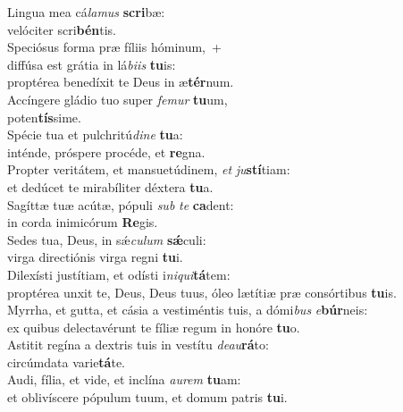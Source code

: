 \evenverse Lingua mea cá\textit{la}\textit{mus} \textbf{scri}bæ:~\*\\
\evenverse velóciter scri\textbf{bén}tis.\\
\oddverse Speciósus forma præ fíliis hóminum,~+\\
\oddverse  diffúsa est grátia in lá\textit{bi}\textit{is} \textbf{tu}is:~\*\\
\oddverse proptérea benedíxit te Deus in æ\textbf{tér}num.\\
\evenverse Accíngere gládio tuo super \textit{fe}\textit{mur} \textbf{tu}um,~\*\\
\evenverse poten\textbf{tís}sime.\\
\oddverse Spécie tua et pulchritú\textit{di}\textit{ne} \textbf{tu}a:~\*\\
\oddverse inténde, próspere procéde, et \textbf{re}gna.\\
\evenverse Propter veritátem, et mansuetúdinem, \textit{et} \textit{ju}\textbf{stí}tiam:~\*\\
\evenverse et dedúcet te mirabíliter déxtera \textbf{tu}a.\\
\oddverse Sagíttæ tuæ acútæ, pópuli \textit{sub} \textit{te} \textbf{ca}dent:~\*\\
\oddverse in corda inimicórum \textbf{Re}gis.\\
\evenverse Sedes tua, Deus, in sǽ\textit{cu}\textit{lum} \textbf{sǽ}culi:~\*\\
\evenverse virga directiónis virga regni \textbf{tu}i.\\
\oddverse Dilexísti justítiam, et odísti i\textit{ni}\textit{qui}\textbf{tá}tem:~\*\\
\oddverse proptérea unxit te, Deus, Deus tuus, óleo lætítiæ præ consórtibus \textbf{tu}is.\\
\evenverse Myrrha, et gutta, et cásia a vestiméntis tuis, a dómi\textit{bus} \textit{e}\textbf{búr}neis:~\*\\
\evenverse ex quibus delectavérunt te fíliæ regum in honóre \textbf{tu}o.\\
\oddverse Astitit regína a dextris tuis in vestítu \textit{de}\textit{au}\textbf{rá}to:~\*\\
\oddverse circúmdata varie\textbf{tá}te.\\
\evenverse Audi, fília, et vide, et inclína \textit{au}\textit{rem} \textbf{tu}am:~\*\\
\evenverse et oblivíscere pópulum tuum, et domum patris \textbf{tu}i.\\
